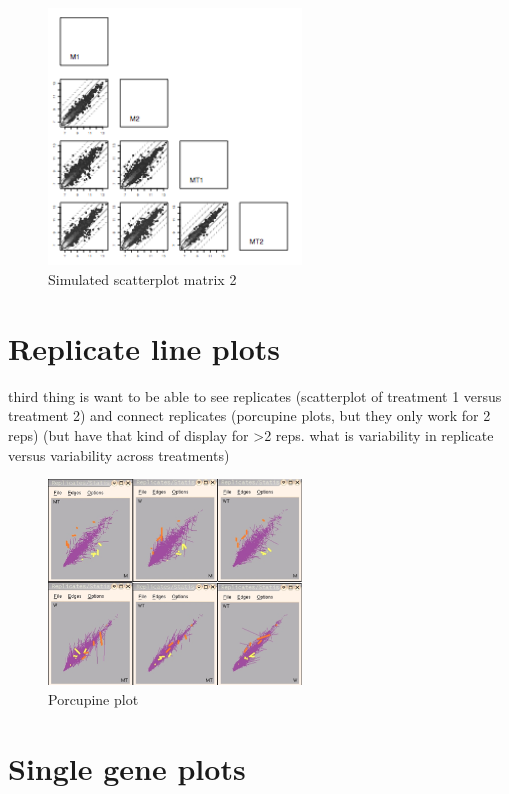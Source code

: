 \documentclass[11pt,a4paper,oldfontcommands,openany]{memoir}
\numberwithin{equation}{section} %
\begin{document}
\begin{figure}[H]
    \centering
    \includegraphics[width=0.6\textwidth]{scatmat2}
    \caption{Simulated scatterplot matrix 2}
    \label{fig:scatmat2}
\end{figure}

\section{Replicate line plots}

third thing is want to be able to see replicates (scatterplot of treatment 1 versus treatment 2) and connect replicates (porcupine plots, but they only work for 2 reps) (but have that kind of display for >2 reps. what is variability in replicate versus variability across treatments)

\begin{figure}[H]
    \centering
    \includegraphics[width=0.6\textwidth]{porcupine}
    \caption{Porcupine plot}
    \label{fig:porcupine}
\end{figure}

\section{Single gene plots}
\end{document}
